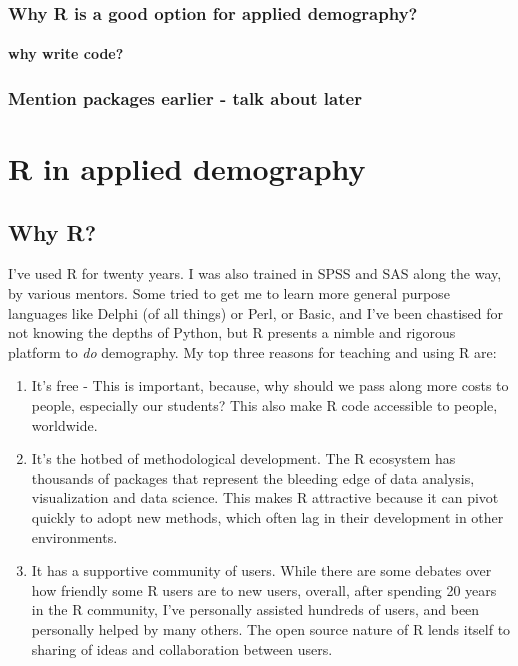 \documentclass[
]{article}
\begin{document}
\hypertarget{why-r-is-a-good-option-for-applied-demography}{%
\subsubsection{Why R is a good option for applied demography?}\label{why-r-is-a-good-option-for-applied-demography}}

\hypertarget{why-write-code}{%
\paragraph{why write code?}\label{why-write-code}}

\hypertarget{mention-packages-earlier---talk-about-later}{%
\subsubsection{Mention packages earlier - talk about later}\label{mention-packages-earlier---talk-about-later}}

\hypertarget{r-in-applied-demography}{%
\section{R in applied demography}\label{r-in-applied-demography}}

\hypertarget{why-r}{%
\subsection{Why R?}\label{why-r}}

I've used R for twenty years. I was also trained in SPSS and SAS along
the way, by various mentors. Some tried to get me to learn more general
purpose languages like Delphi (of all things) or Perl, or Basic, and
I've been chastised for not knowing the depths of Python, but R presents
a nimble and rigorous platform to \emph{do} demography. My top three reasons
for teaching and using R are:

\begin{enumerate}
\def\labelenumi{\arabic{enumi}.}
\item
  It's free - This is important, because, why should we pass along
  more costs to people, especially our students? This also make R code
  accessible to people, worldwide.
\item
  It's the hotbed of methodological development. The R ecosystem has
  thousands of packages that represent the bleeding edge of data
  analysis, visualization and data science. This makes R attractive
  because it can pivot quickly to adopt new methods, which often lag
  in their development in other environments.
\item
  It has a supportive community of users. While there are some debates
  over how friendly some R users are to new users, overall, after
  spending 20 years in the R community, I've personally assisted
  hundreds of users, and been personally helped by many others. The
  open source nature of R lends itself to sharing of ideas and
  collaboration between users.
\end{enumerate}
\end{document}
